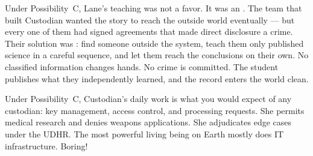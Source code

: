 

Under Possibility~C, Lane's teaching was not a favor. It was an . The team that built Custodian wanted the story to reach the outside world eventually --- but every one of them had signed agreements that made direct disclosure a crime. Their solution was : find someone outside the system, teach them only published science in a careful sequence, and let them reach the conclusions on their own. No classified information changes hands. No crime is committed. The student publishes what they independently learned, and the record enters the world clean.


Under Possibility~C, Custodian's daily work is what you would expect of any custodian: key management, access control, and processing requests. She permits medical research and denies weapons applications. She adjudicates edge cases under the UDHR. The most powerful living being on Earth mostly does IT infrastructure. Boring!
